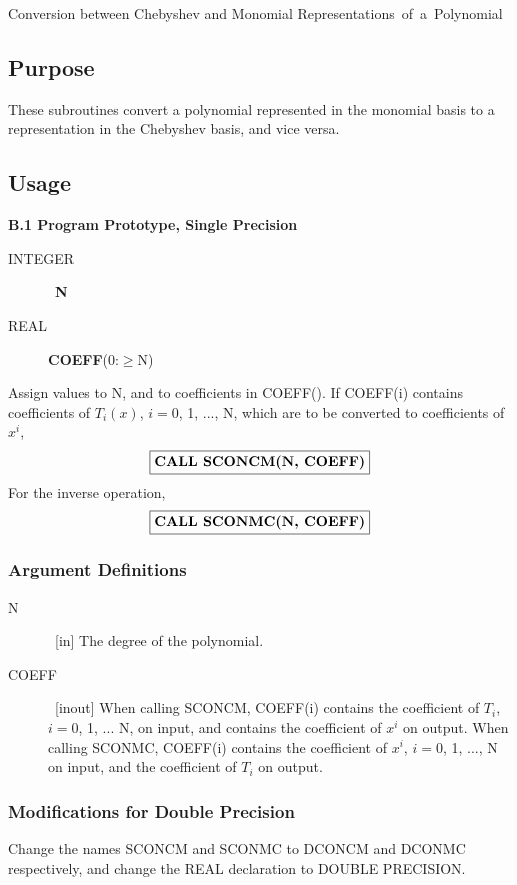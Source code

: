\documentclass[twoside]{MATH77}
\begin{document}
 Conversion between Chebyshev and Monomial
\hbox{Representations of a Polynomial}


\subsection{Purpose}

These subroutines convert a polynomial represented in the monomial basis to
a representation in the Chebyshev basis, and vice versa.

\subsection{Usage}

{\bf B.1 Program Prototype, Single Precision}
\begin{description}
\item[INTEGER]  \ {\bf N}

\item[REAL]  {\bf COEFF}(0:$\geq $N)
\end{description}
Assign values to N, and to coefficients in COEFF(). If COEFF(i) contains
coefficients of $T_i(x)$, $i = 0$, 1, ..., N, which are to be converted to
coefficients of $x^i$,
$$
\fbox{{\bf CALL SCONCM(N, COEFF)}}
$$
For the inverse operation,
$$
\fbox{{\bf CALL SCONMC(N, COEFF)}}
$$
\subsubsection{Argument Definitions}
\begin{description}
\item[N]  \ [in] The degree of the polynomial.

\item[COEFF]  \ [inout] When calling SCONCM, COEFF(i) contains the
coefficient of $T_i$, $i=0$, 1, ... N, on input, and contains the
coefficient of $x^i$ on output. When calling SCONMC, COEFF(i) contains the
coefficient of $x^i$, $i=0$, 1, ..., N on input, and the coefficient of $T_i$
on output.
\end{description}
\subsubsection{Modifications for Double Precision}

Change the names SCONCM and SCONMC to DCONCM and DCONMC respectively, and
change the REAL declaration to DOUBLE PRECISION.
\end{document}
